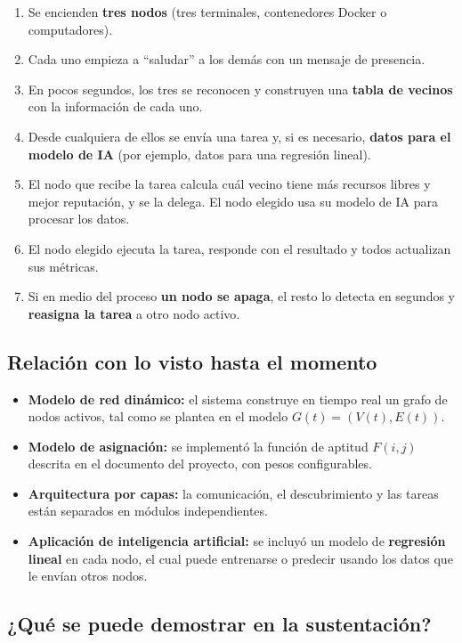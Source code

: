 \documentclass{article}
\begin{document}
\begin{enumerate}
    \item Se encienden \textbf{tres nodos} (tres terminales, contenedores Docker o computadores).
    \item Cada uno empieza a ``saludar'' a los demás con un mensaje de presencia.
    \item En pocos segundos, los tres se reconocen y construyen una \textbf{tabla de vecinos} con la información de cada uno.
    \item Desde cualquiera de ellos se envía una tarea y, si es necesario, \textbf{datos para el modelo de IA} (por ejemplo, datos para una regresión lineal).
    \item El nodo que recibe la tarea calcula cuál vecino tiene más recursos libres y mejor reputación, y se la delega. El nodo elegido usa su modelo de IA para procesar los datos.
    \item El nodo elegido ejecuta la tarea, responde con el resultado y todos actualizan sus métricas.
    \item Si en medio del proceso \textbf{un nodo se apaga}, el resto lo detecta en segundos y \textbf{reasigna la tarea} a otro nodo activo.
\end{enumerate}

\subsection{Relación con lo visto hasta el momento}

\begin{itemize}
    \item \textbf{Modelo de red dinámico:} el sistema construye en tiempo real un grafo de nodos activos, tal como se plantea en el modelo \(G(t) = (V(t), E(t))\).
    \item \textbf{Modelo de asignación:} se implementó la función de aptitud \(F(i,j)\) descrita en el documento del proyecto, con pesos configurables.
    \item \textbf{Arquitectura por capas:} la comunicación, el descubrimiento y las tareas están separados en módulos independientes.
    \item \textbf{Aplicación de inteligencia artificial:} se incluyó un modelo de \textbf{regresión lineal} en cada nodo, el cual puede entrenarse o predecir usando los datos que le envían otros nodos.
\end{itemize}

\subsection{¿Qué se puede demostrar en la sustentación?}
\end{document}
